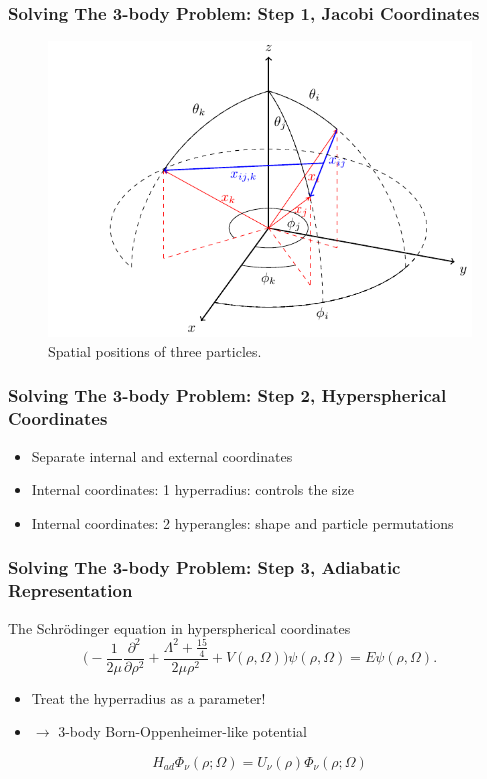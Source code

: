 \documentclass{beamer}
\begin{document}
\begin{frame}
\frametitle{Solving The 3-body Problem: Step 1, Jacobi Coordinates}
\begin{figure}
\centering
\includegraphics[width=0.7\linewidth]{img01.pdf}
\caption{Spatial positions of three particles.}
\end{figure}
\end{frame}

\begin{frame}
\frametitle{Solving The 3-body Problem: Step 2, Hyperspherical Coordinates}
\begin{itemize}
	\item Separate internal and external coordinates
	\item Internal coordinates: 1 hyperradius: controls the size 
	\item Internal coordinates: 2 hyperangles: shape and particle permutations
\end{itemize}
\end{frame}

\begin{frame}
\frametitle{Solving The 3-body Problem: Step 3, Adiabatic Representation}
The Schr{\"o}dinger equation in hyperspherical coordinates
\begin{equation}
\bigg(-\frac{1}{2 \mu}\frac{\partial^2}{\partial \rho^2} + \frac{ \Lambda^2 + \frac{15}{4}}{2 \mu \rho^{2}}+ V(\rho,\Omega)\bigg)\psi(\rho,\Omega) = E\psi(\rho,\Omega).
\end{equation}

\begin{itemize}
\item Treat the hyperradius as a parameter! 

\item $\rightarrow$ 3-body Born-Oppenheimer-like potential
\end{itemize}
\begin{equation}
H_{ad}\Phi_{\nu}{(\rho;\Omega)} = U_{\nu}{(\rho)}\Phi_{\nu}(\rho;\Omega)
\end{equation}
\end{frame}
\end{document}
